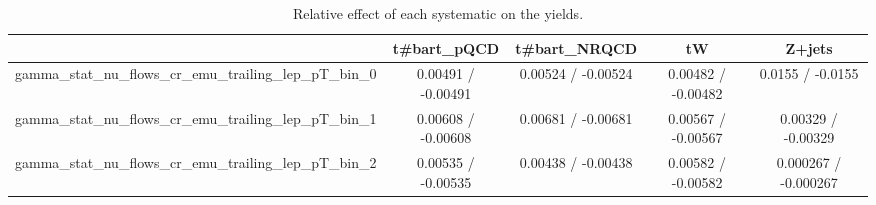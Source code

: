 \documentclass[10pt]{article}
\begin{document}
\begin{table}[htbp]
\begin{center}
\begin{tabular}{|c|c|c|c|c|}
\hline 
      & t#bar{t}_{pQCD}      & t#bar{t}_{NRQCD}      & tW      & Z+jets \\ 
\hline 
  gamma_stat_nu_flows_cr_emu_trailing_lep_pT_bin_0 & 0.00491 / -0.00491 & 0.00524 / -0.00524 & 0.00482 / -0.00482 & 0.0155 / -0.0155 \\ 
  gamma_stat_nu_flows_cr_emu_trailing_lep_pT_bin_1 & 0.00608 / -0.00608 & 0.00681 / -0.00681 & 0.00567 / -0.00567 & 0.00329 / -0.00329 \\ 
  gamma_stat_nu_flows_cr_emu_trailing_lep_pT_bin_2 & 0.00535 / -0.00535 & 0.00438 / -0.00438 & 0.00582 / -0.00582 & 0.000267 / -0.000267 \\ 
\hline 
\end{tabular} 
\caption{Relative effect of each systematic on the yields.} 
\end{center} 
\end{table} 
\end{document}
